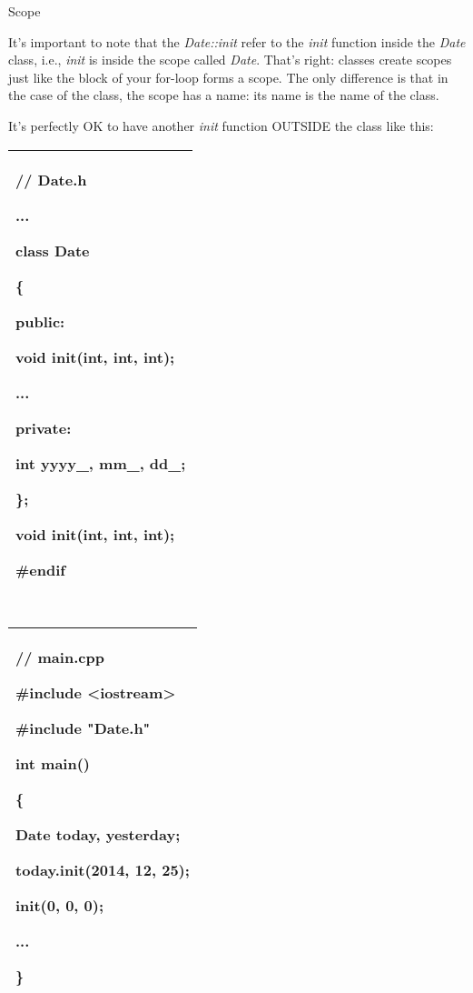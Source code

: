 \documentclass[
]{article}
\begin{document}
Scope

It's important to note that the \emph{Date::init} refer to the
\emph{init} function inside the \emph{Date} class, i.e., \emph{init} is
inside the scope called \emph{Date}. That's right: classes create scopes
just like the block of your for-loop forms a scope. The only difference
is that in the case of the class, the scope has a name: its name is the
name of the class.

It's perfectly OK to have another \emph{init} function OUTSIDE the class
like this:

\begin{longtable}[]{@{}l@{}}
\toprule
\endhead
\begin{minipage}[t]{0.97\columnwidth}\raggedright
// Date.h

...

class Date

\{

public:

void init(int, int, int);

...

private:

int yyyy\_, mm\_, dd\_;

\};

void init(int, int, int);

\#endif\strut
\end{minipage}\tabularnewline
\bottomrule
\end{longtable}

\begin{longtable}[]{@{}@{}}
\toprule
\endhead
\bottomrule
\end{longtable}

\begin{longtable}[]{@{}l@{}}
\toprule
\endhead
\begin{minipage}[t]{0.97\columnwidth}\raggedright
// main.cpp

\#include \textless iostream\textgreater{}

\#include "Date.h"

int main()

\{

Date today, yesterday;

today.init(2014, 12, 25);

\textbf{init(0, 0, 0);}

...

\}\strut
\end{minipage}\tabularnewline
\bottomrule
\end{longtable}
\end{document}
